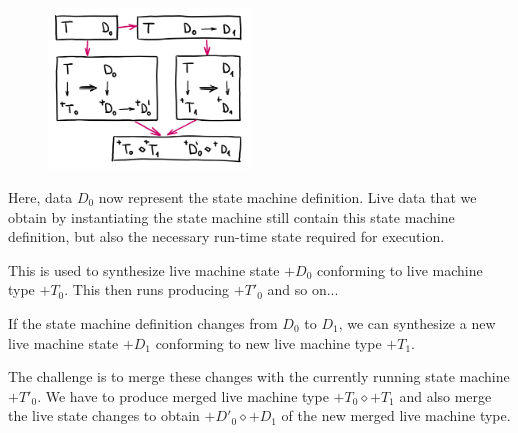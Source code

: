 \documentclass[english,submission]{programming}
\DeclareRobustCommand{\frameworkbox}[1]{\leftbar#1\endleftbar}
\newcommand{\frameworkboxtitle}[1]{\noindent{\firamedium #1.}\quad}
\begin{document}




\frameworkbox{
\begin{figure}
\vspace{-0.5em}
\includegraphics[width=14.5em]{figures/arr-model.png}
\vspace{-1.5em}
\end{figure}
\frameworkboxtitle{TODO}
Here, data $D_0$ now represent the state machine definition.
Live data that we obtain by instantiating the state machine still contain this state machine
definition, but also the necessary run-time state required for execution.

This is used to synthesize live machine state $+D_0$ conforming to live machine type $+T_0$.
This then runs producing $+T'_0$ and so on...

If the state machine definition changes from $D_0$ to $D_1$,
we can synthesize a new live machine state $+D_1$ conforming to new live machine type $+T_1$.

The challenge is to merge these changes with the currently running state machine $+T'_0$.
We have to produce merged live machine type $+T_0 \diamond +T_1$ and also merge the
live state changes to obtain $+D'_0 \diamond +D_1$ of the new merged live machine type.
}
\end{document}
